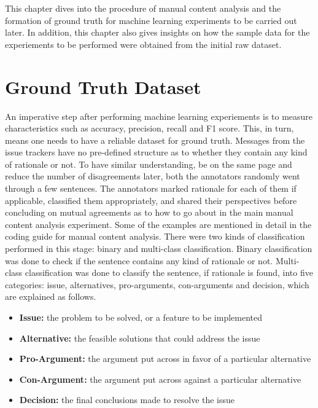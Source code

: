 \documentclass[a4paper,12pt,twoside]{report}
\begin{document}
This chapter dives into the procedure of manual content analysis and the formation of ground truth for machine learning experiments to be carried out later. In addition, this chapter also gives insights on how the sample data for the experiements to be performed were obtained from the initial raw dataset. 

\section{Ground Truth Dataset}
An imperative step after performing machine learning experiements is to measure characteristics such as accuracy, precision, recall and F1 score. This, in turn, means one needs to have a reliable dataset for ground truth. Messages from the issue trackers have no pre-defined structure as to whether they contain any kind of rationale or not. To have similar understanding, be on the same page and reduce the number of disagreements later, both the annotators randomly went through a few sentences. The annotators marked rationale for each of them if applicable, classified them appropriately, and shared their perspectives before concluding on mutual agreements as to how to go about in the main manual content analysis experiment.  Some of the examples are mentioned in detail in the coding guide for manual content analysis. There were two kinds of classification performed in this stage: binary and multi-class classification. Binary classification was done to check if the sentence contains any kind of rationale or not. Multi-class classification was done to classify the sentence, if rationale is found, into five categories: issue, alternatives, pro-arguments, con-arguments and decision, which are explained as follows.

\begin{itemize}
\item \textbf{Issue:} the problem to be solved, or a feature to be implemented
\item \textbf{Alternative:} the feasible solutions that could address the issue
\item \textbf{Pro-Argument:} the argument put across in favor of a particular alternative
\item \textbf{Con-Argument:} the argument put across against a particular alternative
\item \textbf{Decision:} the final conclusions made to resolve the issue
\end{itemize}
\end{document}
